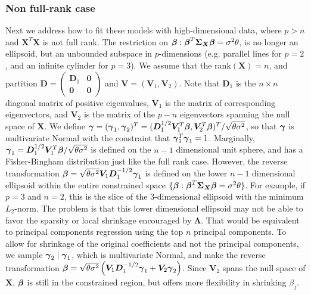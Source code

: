 \documentclass[12pt]{article}
\newcommand{\D}{{\bm  D}}
\newcommand{\V}{{\bm V}}
\newcommand{\X}{{\bm  X}}
\newcommand{\Lambdabf}{{\mathbf \Lambda}}
\newcommand{\Sigmabf}{{\mathbf \Sigma}}
\newcommand{\zerobf}{{\mathbf 0}}
\newcommand{\greekbold}[1]{\mbox{\boldmath $#1$}}
\newcommand{\betabf}{\greekbold{\beta}}
\newcommand{\gammabf}{\greekbold{\gamma}}
\newcommand{\s}{{\sigma^2}}
\begin{document}
\subsubsection{Non full-rank case}
Next we address how to fit these models with high-dimensional data, where $p>n$ and $\X^T\X$ is not full rank.
The restriction on $\betabf: \betabf^T \Sigmabf_\X\betabf= \s\theta$, is no longer an ellipsoid, but an unbounded subspace in $p$-dimensions (e.g. parallel lines for $p=2$, and an infinite cylinder for $p= 3$).
We assume that the rank$(\X)=n$, and partition $\D = \left( \begin{smallmatrix} \D_1 & \zerobf \\ \zerobf & \zerobf \end{smallmatrix} \right)$ and $\V = (\V_1, \V_2)$.
Note that $\D_1$ is the $n\times n$ diagonal matrix of positive eigenvalues, $\V_1$ is the matrix of corresponding eigenvectors, and $\V_2$ is the matrix of the $p-n$ eigenvectors spanning the null space of $\X$.
We define $\gammabf = (\gammabf_1, \gammabf_2)^T = (\D_1^{1/2}\V_1^T\betabf, \V_2^T\betabf)^T/\sqrt{\theta \s}$, so that $\gammabf$ is multivariate Normal with the constraint that $\gammabf_1^T\gammabf_1=1$.
Marginally, $\gammabf_1 = \D_1^{1/2}\V_1^T\betabf/\sqrt{\theta \s}$ is defined on the $n-1$ dimensional unit sphere, and has a Fisher-Bingham distribution just like the full rank case.
However, the reverse transformation $\betabf =  \sqrt{\theta \s} \V_1 \D_1^{-1/2} \gammabf_1$ is defined on the lower $n-1$ dimensional ellipsoid within the entire constrained space $\{\betabf: \betabf^T\Sigmabf_\X\betabf= \s\theta\}$.
For example, if $p = 3$ and $n = 2$, this is the slice of the 3-dimensional ellipsoid with the minimum $L_2$-norm.
The problem is that this lower dimensional ellipsoid may not be able to favor the sparsity or local shrinkage encouraged by $\Lambdabf$.
That would be equivalent to principal components regression using the top $n$ principal components.
To allow for shrinkage of the original coefficients and not the principal components, we sample $\gammabf_2\mid\gammabf_1$, which is multivariate Normal, and make the reverse transformation $ \betabf = \sqrt{\theta \s}\left(\V_1\D_1^{-1/2}\gammabf_1 + \V_2\gammabf_2\right) $.
Since $\V_2$ spans the null space of $\X$, $\betabf$ is still in the constrained region, but offers more flexibility in shrinking $\beta_j$.

\end{document}
